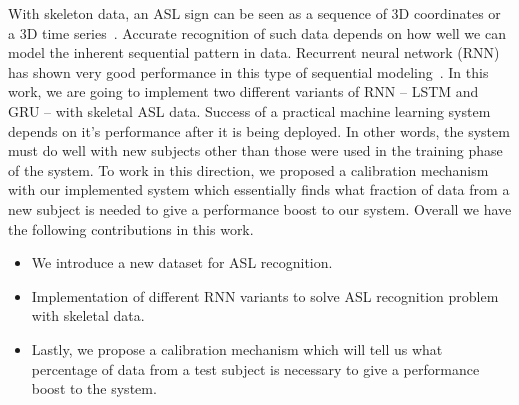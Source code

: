 \documentclass[10pt,twocolumn,letterpaper]{article}
\begin{document}
With skeleton data, an ASL sign can be seen as a sequence of 3D coordinates or a 3D time series~\cite{7298714}. Accurate recognition of such data depends on how well we can model the inherent sequential pattern in data. Recurrent neural network (RNN) has shown very good performance in this type of sequential modeling~\cite{DBLP:journals/corr/Lipton15}. In this work, we are going to implement two different variants of RNN -- LSTM and GRU -- with skeletal ASL data. Success of a practical machine learning system depends on it's performance after it is being deployed. In other words, the system must do well with new subjects other than those were used in the training phase of the system. To work in this direction, we proposed a calibration mechanism with our implemented system which essentially finds what fraction of data from a new subject is needed to give a performance boost to our system. Overall we have the following contributions in this work.
\begin{itemize}  
	\item We introduce a new dataset for ASL recognition.
	\item Implementation of different RNN variants to solve ASL recognition problem with skeletal data.
	\item Lastly, we propose a calibration mechanism which will tell us what percentage of data from a test subject is necessary to give a performance boost to the system.
\end{itemize}
\end{document}
